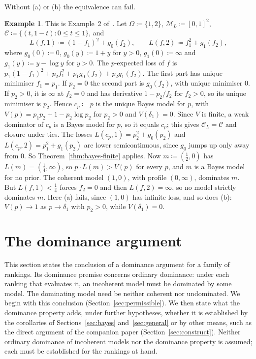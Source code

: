 \documentclass[11pt]{article}
\theoremstyle{definition}
\newtheorem{example}[theorem]{Example}
\theoremstyle{remark}
\newcommand{\M}{\mathcal M}
\newcommand{\C}{\mathcal C}
\begin{document}
Without (a) or (b) the equivalence can fail.
\begin{example}\label{ex:ssk-sharp}
This is Example~2 of~\cite{SSK09}. Let $\Omega\coloneqq\{1,2\}$, $\M_L\coloneqq[0,1]^2$, $\C\coloneqq\{(t,1-t):0\le t\le1\}$, and
\[
L(f,1)\coloneqq(1-f_1)^2+g_0(f_2),\qquad L(f,2)\coloneqq f_1^2+g_1(f_2),
\]
where $g_0(0)\coloneqq0$, $g_0(y)\coloneqq1+y$ for $y>0$, $g_1(0)\coloneqq\infty$ and $g_1(y)\coloneqq y-\log y$ for $y>0$. The $p$-expected loss of $f$ is $p_1(1-f_1)^2+p_2f_1^2+p_1g_0(f_2)+p_2g_1(f_2)$. The first part has unique minimiser $f_1=p_1$. If $p_2=0$ the second part is $g_0(f_2)$, with unique minimiser $0$. If $p_2>0$, it is $\infty$ at $f_2=0$ and has derivative $1-p_2/f_2$ for $f_2>0$, so its unique minimiser is $p_2$. Hence $c_p\coloneqq p$ is the unique Bayes model for $p$, with $V(p)=p_1p_2+1-p_2\log p_2$ for $p_2>0$ and $V(\delta_1)=0$. Since $V$ is finite, a weak dominator of $c_p$ is a Bayes model for $p$, so it equals $c_p$; this gives $\C_L=\C$ and closure under ties. The losses $L(c_p,1)=p_2^2+g_0(p_2)$ and $L(c_p,2)=p_1^2+g_1(p_2)$ are lower semicontinuous, since $g_0$ jumps up only away from $0$. So Theorem~\ref{thm:bayes-finite} applies. Now $m\coloneqq(\frac12,0)$ has $L(m)=(\frac14,\infty)$, so $p\cdot L(m)>V(p)$ for every $p$, and $m$ is a Bayes model for no prior. The coherent model $(1,0)$, with profile $(0,\infty)$, dominates $m$. But $L(f,1)<\frac14$ forces $f_2=0$ and then $L(f,2)=\infty$, so no model strictly dominates $m$. Here (a) fails, since $(1,0)$ has infinite loss, and so does (b): $V(p)\to1$ as $p\to\delta_1$ with $p_2>0$, while $V(\delta_1)=0$.
\end{example}

\section{The dominance argument}\label{sec:conclusion}
This section states the conclusion of a dominance argument for a family of rankings. Its dominance premise concerns ordinary dominance: under each ranking that evaluates it, an incoherent model must be dominated by some model. The dominating model need be neither coherent nor undominated. We begin with this conclusion (Section~\ref{sec:permissible}). We then state what the dominance property adds, under further hypotheses, whether it is established by the corollaries of Sections~\ref{sec:bayes} and~\ref{sec:general} or by other means, such as the direct argument of the companion paper (Section~\ref{sec:construct}). Neither ordinary dominance of incoherent models nor the dominance property is assumed; each must be established for the rankings at hand.
\end{document}
